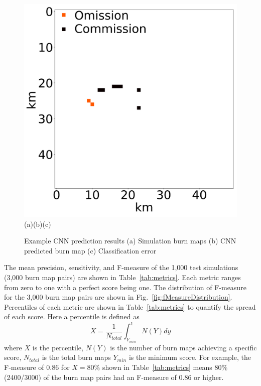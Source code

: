 \documentclass[smallcondensed]{svjour3}     %
\begin{document}
\begin{figure}[htbp]
	\includegraphics[height=0.17\textheight]{exampleNetworkError4.png}
	\\
\hspace{0.038\textwidth}(a)\hspace{0.24\textwidth}(b)\hspace{0.29\textwidth}(c)
\caption{Example CNN prediction results (a) Simulation burn maps (b) CNN predicted burn map (c) Classification error}
\label{fig:exampleNetwork}       %
\end{figure}

The mean precision, sensitivity, and F-measure of the 1,000 test
simulations (3,000 burn map pairs) are shown in Table~\ref{tab:metrics}.
Each metric ranges from zero to one with a perfect score being one. 
The distribution of F-measure for the 3,000 burn map pairs are shown
in Fig.~\ref{fig:fMeasureDistribution}.
Percentiles of each metric are shown in Table~\ref{tab:metrics} to
quantify the spread of each score. Here a percentile is defined as
\begin{equation}
X = \frac{1}{N_{total}}\int_{Y_{min}}^{1}N(Y)dy
\label{eq:percentile}
\end{equation}
where $X$ is the percentile, $N(Y)$ is the number of burn maps achieving
a specific score, $N_{total}$ is the total burn maps $Y_{min}$ is the minimum
score. For example, the F-measure of 0.86 for $X=80\%$ shown in
Table~\ref{tab:metrics} means 80\% (2400/3000) of the burn map pairs
had an F-measure of 0.86 or higher.
\end{document}
